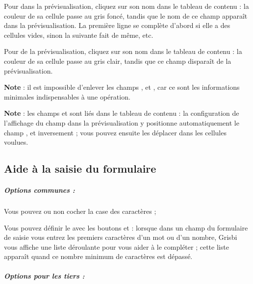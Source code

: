 Pour  dans la prévisualisation, cliquez sur son nom dans le tableau de contenu : la couleur de sa cellule passe au gris foncé, tandis que le nom de ce champ apparaît dans la prévisualisation. La première ligne se complète d'abord si elle a des cellules vides, sinon la suivante fait de même, etc.


Pour  de la  prévisualisation, cliquez sur son nom dans le tableau de contenu : la couleur de sa cellule passe au gris clair, tandis que ce champ disparaît de la prévisualisation.

\textbf{Note} : il est impossible d'enlever les champs  ,  et , car ce sont les informations minimales indispensables à une opération.

\textbf{Note} : les champs  et  sont liés dans le tableau de contenu : la configuration de l'affichage du champ  dans la prévisualisation y positionne automatiquement le champ , et inversement ; vous pouvez ensuite les déplacer dans les cellules voulues.


\subsection{Aide à la saisie du formulaire\label{setup-form-help}}


\subparagraph{Options communes :\label{setup-form-help-common}}

Vous pouvez ou non cocher la case   des caractères ;

Vous pouvez définir le  avec les boutons \menu{+} et \menu{-} : lorsque dans un champ du formulaire de saisie vous entrez les premiers caractères d'un mot ou d'un nombre, Grisbi vous affiche une liste déroulante pour vous aider à le compléter ; cette liste apparaît quand ce nombre minimum de caractères est dépassé.

\subparagraph{Options pour les tiers :\label{setup-form-help-third}}

